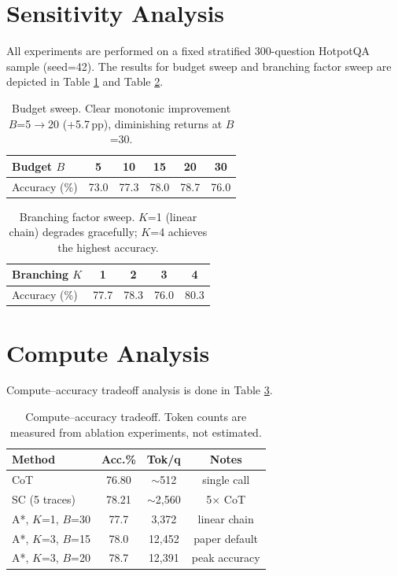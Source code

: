 \documentclass{article}
\begin{document}
\section{Sensitivity Analysis}
\label{app:sensitivity}

All experiments are performed on a fixed stratified 300-question HotpotQA sample (seed=42). The results for budget sweep and branching factor sweep are depicted in Table \ref{tab:sensitivity_budget} and Table \ref{tab:sensitivity_branch}.

\begin{table}[h]
\centering
\small
\begin{tabular}{lccccc}
\toprule
\textbf{Budget $B$} & 5 & 10 & 15 & 20 & 30 \\
\midrule
Accuracy (\%) & 73.0 & 77.3 & 78.0 & 78.7 & 76.0 \\
\bottomrule
\end{tabular}
\caption{Budget sweep. Clear monotonic improvement $B$=5$\to$20 (+5.7\,pp), diminishing returns at $B$=30.}
\label{tab:sensitivity_budget}
\end{table}

\begin{table}[h]
\centering
\small
\begin{tabular}{lcccc}
\toprule
\textbf{Branching $K$} & 1 & 2 & 3 & 4 \\
\midrule
Accuracy (\%) & 77.7 & 78.3 & 76.0 & 80.3 \\
\bottomrule
\end{tabular}
\caption{Branching factor sweep. $K$=1 (linear chain) degrades gracefully; $K$=4 achieves the highest accuracy.}
\label{tab:sensitivity_branch}
\end{table}

\section{Compute Analysis}
\label{app:compute}
Compute--accuracy tradeoff analysis is done in Table \ref{tab:compute}.
\begin{table}[h]
\centering
\small
\begin{tabular}{lccc}
\toprule
\textbf{Method} & \textbf{Acc.\%} & \textbf{Tok/q} & \textbf{Notes} \\
\midrule
CoT & 76.80 & $\sim$512 & single call \\
SC (5 traces) & 78.21 & $\sim$2,560 & 5$\times$ CoT \\
A*, $K$=1, $B$=30 & 77.7 & 3,372 & linear chain \\
A*, $K$=3, $B$=15 & 78.0 & 12,452 & paper default \\
A*, $K$=3, $B$=20 & 78.7 & 12,391 & peak accuracy \\
\bottomrule
\end{tabular}
\caption{Compute--accuracy tradeoff. Token counts are measured from ablation experiments, not estimated.}
\label{tab:compute}
\end{table}
\end{document}
